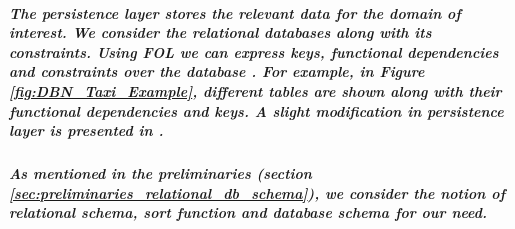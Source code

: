 \subparagraph*{\textnormal{The persistence layer stores the relevant data for the domain of interest. We consider the relational databases along with its constraints. Using FOL we can express keys, functional dependencies and constraints over the database \cite{BagheriHariri}. For example, in Figure \ref{fig:DBN_Taxi_Example}, different tables are shown along with their functional dependencies and keys. A slight modification in persistence layer is presented in \cite{DBLP:journals/corr/DBNets}.}}

\subparagraph*{\textnormal{As mentioned in the preliminaries (section \ref{sec:preliminaries_relational_db_schema}), we consider the notion of relational schema, sort function and database schema for our need. }}

